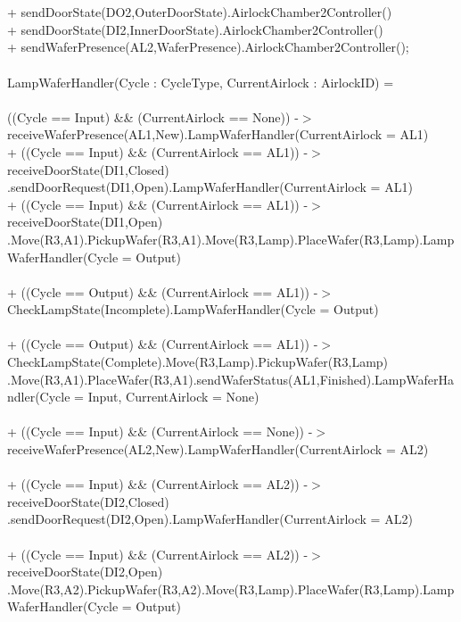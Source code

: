 \documentclass[a4paper,12pt]{article}
\begin{document}
	\\
	\\+ sendDoorState(DO2,OuterDoorState).AirlockChamber2Controller()
	\\+ sendDoorState(DI2,InnerDoorState).AirlockChamber2Controller()
	\\+ sendWaferPresence(AL2,WaferPresence).AirlockChamber2Controller();
	\\
	\\LampWaferHandler(Cycle : CycleType, CurrentAirlock : AirlockID) = 
	\\
	\\((Cycle == Input) \&\& (CurrentAirlock == None)) -$>$ receiveWaferPresence(AL1,New).LampWaferHandler(CurrentAirlock = AL1)
	\\+ ((Cycle == Input) \&\& (CurrentAirlock == AL1)) -$>$ receiveDoorState(DI1,Closed)
	\\.sendDoorRequest(DI1,Open).LampWaferHandler(CurrentAirlock = AL1)
	\\+ ((Cycle == Input) \&\& (CurrentAirlock == AL1)) -$>$ receiveDoorState(DI1,Open)
	\\.Move(R3,A1).PickupWafer(R3,A1).Move(R3,Lamp).PlaceWafer(R3,Lamp).LampWaferHandler(Cycle = Output)
	\\
	\\+ ((Cycle == Output) \&\& (CurrentAirlock == AL1)) -$>$ CheckLampState(Incomplete).LampWaferHandler(Cycle = Output)
	\\
	\\+ ((Cycle == Output) \&\& (CurrentAirlock == AL1)) -$>$ CheckLampState(Complete).Move(R3,Lamp).PickupWafer(R3,Lamp)
	\\.Move(R3,A1).PlaceWafer(R3,A1).sendWaferStatus(AL1,Finished).LampWaferHandler(Cycle = Input, CurrentAirlock = None)
	\\
	\\+ ((Cycle == Input) \&\& (CurrentAirlock == None)) -$>$ receiveWaferPresence(AL2,New).LampWaferHandler(CurrentAirlock = AL2)
	\\
	\\+ ((Cycle == Input) \&\& (CurrentAirlock == AL2)) -$>$ receiveDoorState(DI2,Closed)
	\\.sendDoorRequest(DI2,Open).LampWaferHandler(CurrentAirlock = AL2)
	\\
	\\+ ((Cycle == Input) \&\& (CurrentAirlock == AL2)) -$>$ receiveDoorState(DI2,Open)\\.Move(R3,A2).PickupWafer(R3,A2).Move(R3,Lamp).PlaceWafer(R3,Lamp).LampWaferHandler(Cycle = Output)
\end{document}

